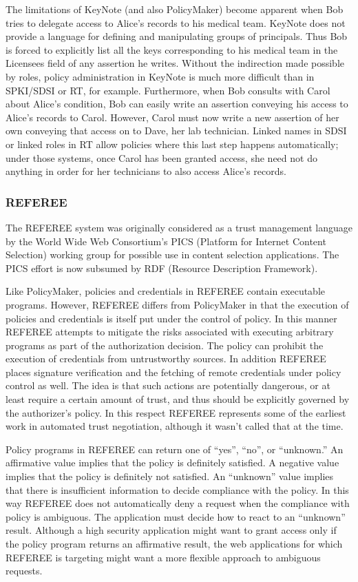The limitations of KeyNote (and also PolicyMaker) become apparent when
Bob tries to delegate access to Alice's records to his medical
team. KeyNote does not provide a language for defining and
manipulating groups of principals.  Thus Bob is forced to explicitly
list all the keys corresponding to his medical team in the Licensees
field of any assertion he writes. Without the indirection made
possible by roles, policy administration in KeyNote is much more
difficult than in SPKI/SDSI or RT, for example.  Furthermore, when Bob
consults with Carol about Alice's condition, Bob can easily write an
assertion conveying his access to Alice's records to Carol. However,
Carol must now write a new assertion of her own conveying that access
on to Dave, her lab technician. Linked names in SDSI or linked roles
in RT allow policies where this last step happens automatically; under
those systems, once Carol has been granted access, she need not do
anything in order for her technicians to also access Alice's records.


\subsubsection{REFEREE}

The REFEREE system \cite{Chu:RTMWA} was originally considered as a
trust management language by the World Wide Web Consortium's PICS
(Platform for Internet Content Selection) working group
\cite{Resnick:PIACWC} for possible use in content selection
applications. The PICS effort is now subsumed by RDF (Resource
Description Framework).

Like PolicyMaker, policies and credentials in REFEREE contain executable
programs. However, REFEREE differs from PolicyMaker in that the execution
of policies and credentials is itself put under the control of policy. In
this manner REFEREE attempts to mitigate the risks associated with
executing arbitrary programs as part of the authorization decision. The
policy can prohibit the execution of credentials from untrustworthy
sources. In addition REFEREE places signature verification and the fetching
of remote credentials under policy control as well. The idea is that such
actions are potentially dangerous, or at least require a certain amount of
trust, and thus should be explicitly governed by the authorizer's policy.
In this respect REFEREE represents some of the earliest work in automated
trust negotiation, although it wasn't called that at the time.

Policy programs in REFEREE can return one of ``yes'', ``no'', or
``unknown.'' An affirmative value implies that the policy is definitely
satisfied. A negative value implies that the policy is definitely not
satisfied. An ``unknown'' value implies that there is insufficient
information to decide compliance with the policy. In this way REFEREE does
not automatically deny a request when the compliance with policy is
ambiguous. The application must decide how to react to an ``unknown''
result. Although a high security application might want to grant access
only if the policy program returns an affirmative result, the web applications
for which REFEREE is targeting might want a more flexible approach to
ambiguous requests.

